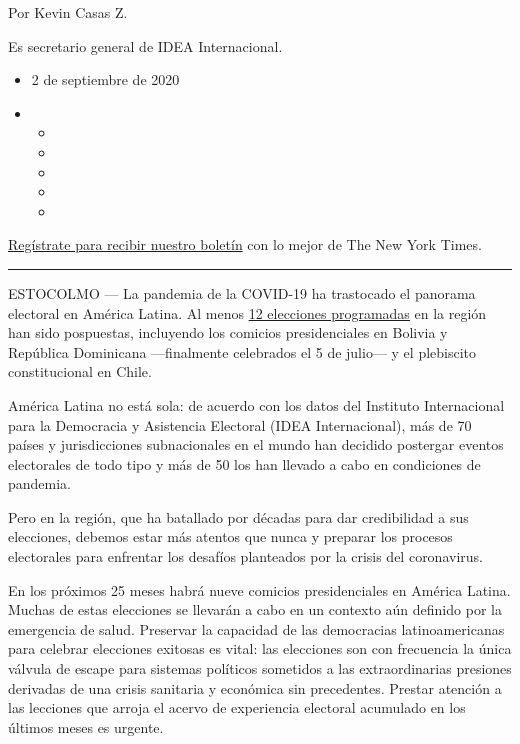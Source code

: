 Por Kevin Casas Z.

Es secretario general de IDEA Internacional.

\begin{itemize}
\item
  2 de septiembre de 2020
\item
  \begin{itemize}
  \item
  \item
  \item
  \item
  \item
  \end{itemize}
\end{itemize}

\href{https://www.nytimes3xbfgragh.onion/newsletters/el-times}{Regístrate
para recibir nuestro boletín} con lo mejor de The New York Times.

\begin{center}\rule{0.5\linewidth}{\linethickness}\end{center}

ESTOCOLMO --- La pandemia de la COVID-19 ha trastocado el panorama
electoral en América Latina. Al menos
\href{https://www.idea.int/es/news-media/news/es/elecciones-y-covid-19-lecciones-de-am\%C3\%A9rica-latina}{12
elecciones programadas} en la región han sido pospuestas, incluyendo los
comicios presidenciales en Bolivia y República Dominicana ---finalmente
celebrados el 5 de julio--- y el plebiscito constitucional en Chile.

América Latina no está sola: de acuerdo con los datos del Instituto
Internacional para la Democracia y Asistencia Electoral (IDEA
Internacional), más de 70 países y jurisdicciones subnacionales en el
mundo han decidido postergar eventos electorales de todo tipo y más de
50 los han llevado a cabo en condiciones de pandemia.

Pero en la región, que ha batallado por décadas para dar credibilidad a
sus elecciones, debemos estar más atentos que nunca y preparar los
procesos electorales para enfrentar los desafíos planteados por la
crisis del coronavirus.

En los próximos 25 meses habrá nueve comicios presidenciales en América
Latina. Muchas de estas elecciones se llevarán a cabo en un contexto aún
definido por la emergencia de salud. Preservar la capacidad de las
democracias latinoamericanas para celebrar elecciones exitosas es vital:
las elecciones son con frecuencia la única válvula de escape para
sistemas políticos sometidos a las extraordinarias presiones derivadas
de una crisis sanitaria y económica sin precedentes. Prestar atención a
las lecciones que arroja el acervo de experiencia electoral acumulado en
los últimos meses es urgente.

